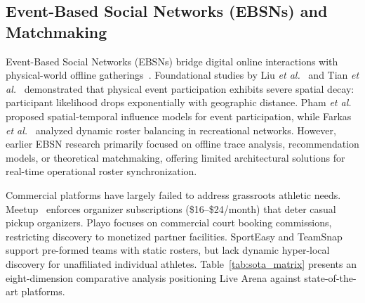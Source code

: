 \documentclass[conference]{IEEEtran}
\begin{document}
\subsection{Event-Based Social Networks (EBSNs) and Matchmaking}
Event-Based Social Networks (EBSNs) bridge digital online interactions with physical-world offline gatherings~\cite{liu2012event, tian2013event}. Foundational studies by Liu \textit{et al.}~\cite{liu2012event} and Tian \textit{et al.}~\cite{tian2013event} demonstrated that physical event participation exhibits severe spatial decay: participant likelihood drops exponentially with geographic distance. Pham \textit{et al.}~\cite{pham2012ebm} proposed spatial-temporal influence models for event participation, while Farkas \textit{et al.}~\cite{farkas2023event} analyzed dynamic roster balancing in recreational networks. However, earlier EBSN research primarily focused on offline trace analysis, recommendation models, or theoretical matchmaking, offering limited architectural solutions for real-time operational roster synchronization.

Commercial platforms have largely failed to address grassroots athletic needs. Meetup~\cite{ricken2017going} enforces organizer subscriptions (\$16--\$24/month) that deter casual pickup organizers. Playo focuses on commercial court booking commissions, restricting discovery to monetized partner facilities. SportEasy and TeamSnap support pre-formed teams with static rosters, but lack dynamic hyper-local discovery for unaffiliated individual athletes. Table~\ref{tab:sota_matrix} presents an eight-dimension comparative analysis positioning Live Arena against state-of-the-art platforms.
\end{document}
